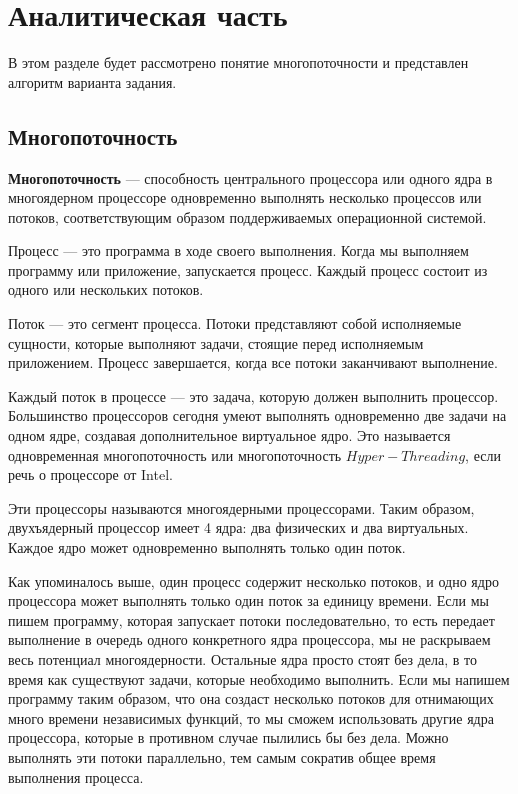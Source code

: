 \chapter{Аналитическая часть}
В этом разделе будет рассмотрено понятие многопоточности и представлен алгоритм варианта задания.

\section{Многопоточность}

\textbf{Многопоточность} \cite{threads} --- способность центрального процессора или одного ядра в многоядерном процессоре одновременно выполнять несколько процессов или потоков, соответствующим образом поддерживаемых операционной системой.

Процесс --- это программа в ходе своего выполнения. Когда мы выполняем программу или приложение, запускается процесс. Каждый процесс состоит из одного или нескольких потоков.

Поток --- это сегмент процесса. Потоки представляют собой исполняемые сущности, которые выполняют задачи, стоящие перед исполняемым приложением. Процесс завершается, когда все потоки заканчивают выполнение.

Каждый поток в процессе --- это задача, которую должен выполнить процессор. Большинство процессоров сегодня умеют выполнять одновременно две задачи на одном ядре, создавая дополнительное виртуальное ядро. Это называется одновременная многопоточность или многопоточность $Hyper-Threading$, если речь о процессоре от Intel. 

Эти процессоры называются многоядерными процессорами. Таким образом, двухъядерный процессор имеет 4 ядра: два физических и два виртуальных. Каждое ядро может одновременно выполнять только один поток.

Как упоминалось выше, один процесс содержит несколько потоков, и одно ядро процессора может выполнять только один поток за единицу времени. Если мы пишем программу, которая запускает потоки последовательно, то есть передает выполнение в очередь одного конкретного ядра процессора, мы не раскрываем весь потенциал многоядерности. Остальные ядра просто стоят без дела, в то время как существуют задачи, которые необходимо выполнить. Если мы напишем программу таким образом, что она создаст несколько потоков для отнимающих много времени независимых функций, то мы сможем использовать другие ядра процессора, которые в противном случае пылились бы без дела. Можно выполнять эти потоки параллельно, тем самым сократив общее время выполнения процесса.


